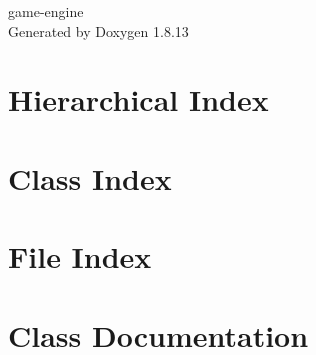 \documentclass[twoside]{book}
\newcommand{\+}{\discretionary{\mbox{\scriptsize$\hookleftarrow$}}{}{}}
\newcommand{\clearemptydoublepage}{%
  \newpage{\pagestyle{empty}\cleardoublepage}%
}
\begin{document}
\hypersetup{pageanchor=false,
             bookmarksnumbered=true,
             pdfencoding=unicode
            }
\begin{titlepage}
\vspace*{7cm}
\begin{center}%
{\Large game-\/engine }\\
\vspace*{1cm}
{\large Generated by Doxygen 1.8.13}\\
\end{center}
\end{titlepage}
\clearemptydoublepage
{}
\tableofcontents
\clearemptydoublepage
{}
\hypersetup{pageanchor=true}

\chapter{Hierarchical Index}

\chapter{Class Index}

\chapter{File Index}

\chapter{Class Documentation}


































\end{document}
